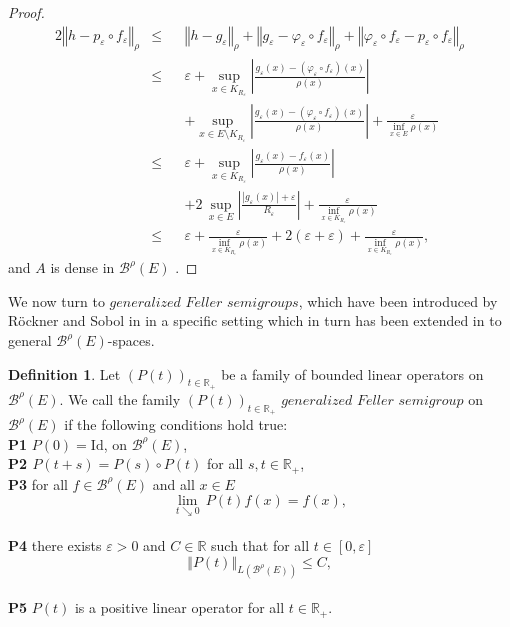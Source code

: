 \documentclass[a4paper,12pt]{article}
\theoremstyle{definition}
\newtheorem{definition}[theorem]{Definition}
\theoremstyle{remark}
\numberwithin{equation}{section}
\numberwithin{theorem}{section}
\begin{document}
\begin{proof}
\begin{alignat*}{2}
\left\Vert h-p_{\varepsilon}\circ f_{\varepsilon}\right\Vert _{\rho} &  \leq &&\left\Vert     h-g_{\varepsilon}\right\Vert _{\rho}+\left\Vert g_{\varepsilon}-\varphi_{\varepsilon}\circ f_{\varepsilon}\right\Vert _{\rho}+\left\Vert \varphi_{\varepsilon}\circ f_{\varepsilon}-p_{\varepsilon}\circ f_{\varepsilon}\right\Vert _{\rho}\\
 & \leq && \varepsilon +\underset{x\in K_{R_{\varepsilon}}}{\sup}\left|\frac{g_{\varepsilon}(x)-\left(\varphi_{\varepsilon}\circ f_{\varepsilon}\right)(x)}{\rho(x)}\right|\\
  & &&+\underset{x\in E\setminus K_{R_{\varepsilon}}}{\sup}\left|\frac{g_{\varepsilon}(x)-\left(\varphi_{\varepsilon}\circ f_{\varepsilon}\right)(x)}{\rho(x)}\right|+\frac{\varepsilon}{\underset{x\in E}{\inf}\rho(x)}\\
 & \leq && \varepsilon +\underset{x\in K_{R_{\varepsilon}}}{\sup}\left|\frac{g_{\varepsilon}(x)-f_{\varepsilon}(x)}{\rho(x)}\right|\\
 & &&+2\,\underset{x\in E}{\sup}\left|\frac{\left|g_{\varepsilon}(x)\right|+\varepsilon}{R_{\varepsilon}}\right|+\frac{\varepsilon}{\underset{x\in K_{R_{\varepsilon}}}{\inf}\rho(x)}\\
& \leq  && \varepsilon +\frac{\varepsilon}{\underset{x\in K_{R_{\varepsilon}}}{\inf}\rho(x)}+2\left(\varepsilon+\varepsilon\right)+\frac{\varepsilon}{\underset{x\in K_{R_{\varepsilon}}}{\inf}\rho(x)},
\end{alignat*}
and $A$ is dense in $\mathcal{\mathscr{B}}^{\rho}(E)$ . 
\end{proof}

We now turn to $\mathit{generalized}$ $\mathit{Feller}$ $\mathit{semigroup}s$, which
 have been introduced by Röckner and Sobol in \cite{RoS} in a specific setting which in turn has been extended in \cite{DoT} to
general $\mathcal{\mathscr{B}}^{\rho}(E)$-spaces.

\begin{definition}
\label{def:generalized Feller semigroup}Let $\left(P(t)\right)_{t\in\mathbb{R}_{+}}$
be a family of bounded linear operators on $ \mathcal{\mathscr{B}}^{\rho}(E)$.
We call the family $\left(P(t)\right)_{t\in\mathbb{R}_{+}}$ $\mathit{generalized}$
$\mathit{Feller}$ $\mathit{semigroup}$ on
$\mathcal{\mathscr{B}}^{\rho}(E)$ if the following conditions hold true:\\
\textbf{P1} $P(0)=\text{Id}$, 
on $\mathcal{\mathscr{B}}^{\rho}(E)$, \\
\textbf{P2 $P(t+s)=P(s)\circ P(t)$ }for all $s,t\in\mathbb{R}_{+}$,
\textbf{}\\
\textbf{P3} for all $f\in\mathcal{\mathscr{B}}^{\rho}(E)$ and all
$x\in E$
\[
\underset{t\searrow0}{\lim}\,P(t)f(x)=f(x),
\]
\\
\textbf{P4} there exists $\varepsilon>0$ and $C\in\mathbb{R}$ such
that for all $t\in\left[0,\varepsilon\right]$
\[
\left\Vert P(t)\right\Vert _{L\left(\mathcal{\mathscr{B}}^{\rho}(E)\right)}\leq C,
\]
\\
\textbf{P5}  $P(t)$ is a positive linear operator
for all $t\in\mathbb{R}_{+}$.
\end{definition}
\end{document}

